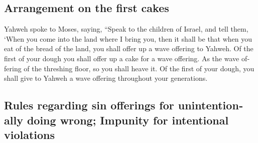 \begin{paracol}{2}
\begin{otherlanguage}{english}
\hypertarget{arrangement-on-the-first-cakes}{%
\subsection{Arrangement on the first
cakes}\label{arrangement-on-the-first-cakes}}

 Yahweh spoke to Moses, saying,  ``Speak
to the children of Israel, and tell them, `When you come into the land
where I bring you,  then it shall be that when you eat of
the bread of the land, you shall offer up a wave offering to Yahweh.
 Of the first of your dough you shall offer up a cake for
a wave offering. As the wave offering of the threshing floor, so you
shall heave it.  Of the first of your dough, you shall
give to Yahweh a wave offering throughout your generations.

\hypertarget{rules-regarding-sin-offerings-for-unintentionally-doing-wrong-impunity-for-intentional-violations}{%
\subsection{Rules regarding sin offerings for unintentionally doing
wrong; Impunity for intentional
violations}\label{rules-regarding-sin-offerings-for-unintentionally-doing-wrong-impunity-for-intentional-violations}}


\end{otherlanguage}
\end{paracol}
